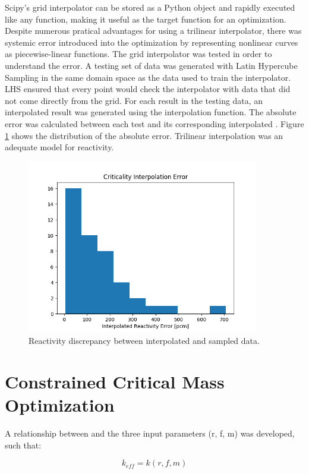 Scipy's grid interpolator can be stored as a Python object and rapidly executed like any
function, making it useful as the target function for an
optimization. Despite numerous pratical advantages for using a trilinear
interpolator, there was systemic error introduced into the optimization by
representing nonlinear curves as piecewise-linear functions. The grid
interpolator was tested in order to understand the error. A testing set of data 
was generated with Latin Hypercube Sampling in the same 
domain space as the data used to train the interpolator. LHS ensured that every
point would check the interpolator with data that did not come directly from
the grid. For each \keff result in the
testing data, an interpolated result was generated using the interpolation
function. The absolute error was calculated
between each test \keff and its corresponding interpolated \keff. Figure
\ref{fig:interp_check} shows the distribution of the absolute error. Trilinear
interpolation was an adequate model for reactivity.

\begin{figure}[h]
    \centering
    \includegraphics[width=4in]{../images/check_interp.png}
\caption{Reactivity discrepancy between interpolated and sampled data.}
\label{fig:interp_check}
\end{figure}

\section{Constrained Critical Mass Optimization}\label{sec:crit_rad_search}
A relationship between \keff and the three input
parameters (r, f, m) was developed, such that:

\begin{equation}
    k_{eff} = k(r, f, m)
\label{eq:gen_keff}
\end{equation}

